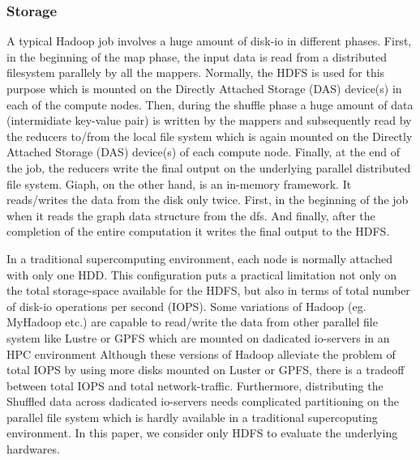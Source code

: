 \documentclass[conference]{IEEEtran}
\begin{document}
\subsubsection {Storage}
A typical Hadoop job involves a huge amount of disk-io in different phases. 
First, in the beginning of the map phase, the input data is read from a distributed filesystem parallely by all the mappers.
Normally, the HDFS is used for this purpose which is mounted on the Directly Attached Storage (DAS) device(s) in each of the compute nodes. 
Then, during the shuffle phase a huge amount of data (intermidiate key-value pair) is written by the mappers and subsequently read by the reducers to/from the local file system which is again mounted on the Directly Attached Storage (DAS) device(s) of each compute node.
Finally, at the end of the job, the reducers write the final output on the underlying parallel distributed file system.
Giaph, on the other hand, is an in-memory framework. It reads/writes the data from the disk only twice. First, in the beginning of the job when it reads the graph data structure from the dfs. And finally, after the completion of the entire computation it writes the final output to the HDFS.

In a traditional supercomputing environment, each node is normally attached with only one HDD. 
This configuration puts a practical limitation not only on the total storage-space available for the HDFS, but also in terms of total number of disk-io operations per second (IOPS).
Some variations of Hadoop (eg. MyHadoop etc.) are capable to read/write the data from other parallel file system like Lustre or GPFS which are mounted on dadicated io-servers in an HPC environment 
Although these versions of Hadoop alleviate the problem of total IOPS by using more disks mounted on Luster or GPFS, there is a tradeoff between total IOPS and total network-traffic.
Furthermore, distributing the Shuffled data across dadicated io-servers needs complicated partitioning on the parallel file system which is hardly available in a traditional supercoputing environment.
In this paper, we consider only HDFS to evaluate the underlying hardwares.
\end{document}
